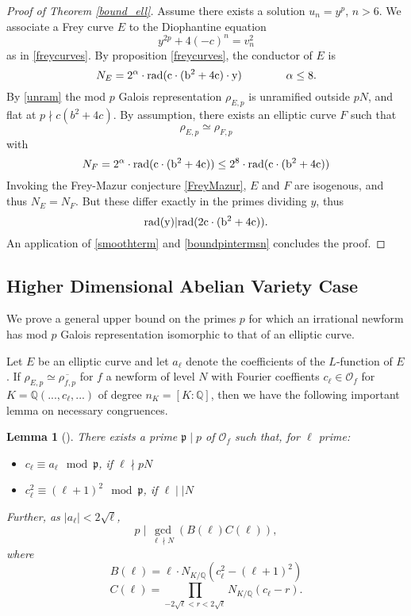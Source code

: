 \documentclass[12pt]{amsart}
\newtheorem{lem}[thm]{Lemma}
\theoremstyle{definition}
\def\O{{\mathcal O}}
\def\Q{{\mathbb Q}}
\newcommand{\rad}{\rm rad}
\renewcommand{\bar}{\overline}
\newcommand{\notdiv}{\nmid}
\begin{document}
\begin{proof}[Proof of Theorem \ref{bound_ell}]
Assume there exists a solution $u_n = y^p$, $n > 6$.
We associate a Frey curve $E$ to the Diophantine equation
\[ y^{2p} +4(-c)^n = v_n^2 \]
as in \ref{freycurves}.  By proposition \ref{freycurves}, the conductor of $E$ is
\[ N_E = 2^{\alpha}  \cdot \rad( c \cdot (b^2+4c) \cdot y) \qquad \qquad \alpha \leq 8. \]
By \ref{unram} the mod $p$ Galois representation $\rho_{E,p}$ is unramified outside $pN$, and flat at $p \notdiv c(b^2+4c)$. By assumption, there exists an elliptic curve $F$ such that
\[ \rho_{E,p} \simeq \rho_{F,p} \]  
with
\[N_F = 2^{\alpha} \cdot  \rad( c \cdot (b^2+4c)) \leq 2^8 \cdot \rad(c \cdot (b^2+4c))  \]
Invoking the Frey-Mazur conjecture \ref{FreyMazur}, $E$ and $F$ are isogenous, and thus $N_E = N_F$.  But these differ exactly in the primes dividing $y$, thus
\[ \rad(y) | \rad(2c \cdot (b^2+4c)). \]
 An application of \ref{smoothterm} and \ref{boundpintermsn} concludes the proof.
\end{proof}


\subsection{Higher Dimensional Abelian Variety Case}
We prove a general upper bound on the primes $p$ for which an irrational newform has mod $p$ Galois representation isomorphic to that of an elliptic curve.
 
Let $E$ be an elliptic curve and let $a_\ell$ denote the coefficients of the $L$-function of $E$.  If $\rho_{E,p} \simeq \bar{\rho_{f,p}}$ for $f$ a newform of level $N$ with Fourier coeffients $c_\ell\in \O_f$ for $K =  \Q(...,c_\ell,...)$ of degree $n_K = [K:\mathbb{Q}]$, then we have the following important lemma on necessary congruences.

\begin{lem}[\cite{cohen06}]\label{ircong1}
There exists a prime $\mathfrak{p} \mid p$ of $\mathcal{O}_f$ such that, for $\ell$ prime:
\begin{itemize}
\item $c_\ell \equiv a_\ell \mod \mathfrak{p}$, if $\ell \nmid pN$
\item $c_\ell^2 \equiv (\ell+1)^2 \mod \mathfrak{p}$, if $\ell \mid\mid N$
\end{itemize}
Further, as $|a_\ell| < 2\sqrt{\ell}$,
\[p \mid \gcd_{\ell \nmid N}(B(\ell)C(\ell)), \] where
\[B(\ell) = \ell \cdot N_{K / \mathbb{Q}}(c_\ell^2-(\ell+1)^2) \]
\[C(\ell) = \prod_{-2\sqrt{\ell} < r < 2\sqrt{\ell}}{N_{K / \mathbb{Q}}}(c_\ell - r).\]
\end{lem}
\end{document}
